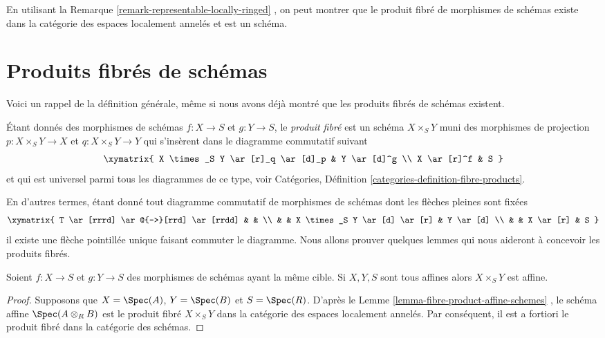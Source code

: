 \begin{remark}
\label{remark-fibre-product-schemes-locally-ringed}
En utilisant la Remarque  \ref{remark-representable-locally-ringed} , on peut montrer que le produit fibré de
morphismes de schémas existe dans la catégorie des espaces localement annelés et
est un schéma.
\end{remark}




\section{Produits fibrés de schémas}
\label{section-fibre-products}

\noindent
Voici un rappel de la définition générale, même si nous avons déjà montré que les
produits fibrés de schémas existent.

\begin{definition}
\label{definition-fibre-product}
Étant donnés des morphismes de schémas $f : X \to S$  et  $g : Y \to S$, le
 {\it produit fibré}  est un schéma $X \times_S Y$ muni
des morphismes de projection $p : X \times_S Y \to X$  et  $q : X \times_S Y \to Y$ qui s'insèrent dans le
diagramme commutatif suivant
$$
\xymatrix{
X \times_S Y \ar[r]_q \ar[d]_p & Y \ar[d]^g \\
X \ar[r]^f & S
}
$$
et qui est universel parmi tous les diagrammes de ce type, voir Catégories,
Définition \ref{categories-definition-fibre-products}.
\end{definition}

\noindent
En d'autres termes, étant donné tout diagramme commutatif de morphismes de
schémas dont les flèches pleines sont fixées
$$
\xymatrix{
T \ar[rrrd] \ar@{-->}[rrd] \ar[rrdd]
&
&
\\
&
&
X \times_S Y \ar[d] \ar[r]
&
Y \ar[d]
\\
&
&
X \ar[r]
&
S
}
$$
il existe une flèche pointillée unique faisant commuter le diagramme. Nous allons
prouver quelques lemmes qui nous aideront à concevoir les produits fibrés.

\begin{lemma}
\label{lemma-fibre-product-affines}
Soient $f : X \to S$  et  $g : Y \to S$ des morphismes de schémas ayant la même
cible. Si $X, Y, S$ sont tous affines alors $X \times_S Y$  est affine.
\end{lemma}

\begin{proof}
Supposons que  $X = \Spec(A)$,  $Y = \Spec(B)$  et  $S = \Spec(R)$. D'après le Lemme
 \ref{lemma-fibre-product-affine-schemes} , le schéma affine  $\Spec(A \otimes_R B)$  est le produit fibré  $X \times_S Y$  dans
la catégorie des espaces localement annelés. Par conséquent, il est a fortiori le
produit fibré dans la catégorie des schémas.
\end{proof}

